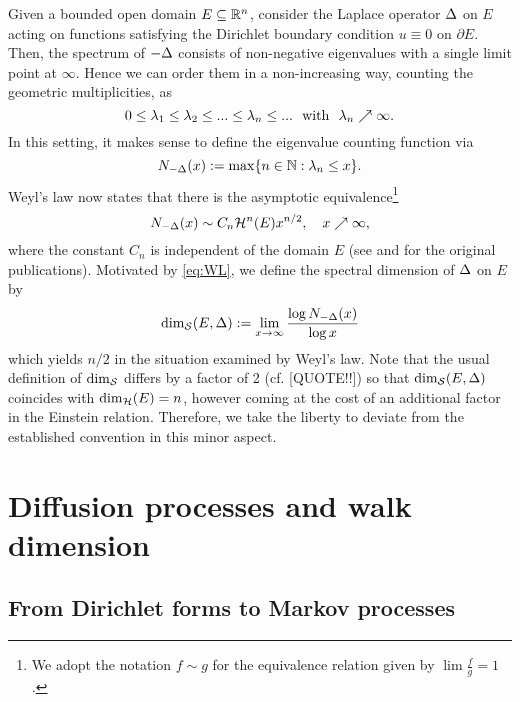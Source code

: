 Given a bounded open domain $E\subseteq\mathbb{R}^n$, consider the Laplace operator $\Delta$ on $E$ acting on functions satisfying the Dirichlet boundary condition $u\equiv0$ on $\partial E$. Then, the spectrum of $-\Delta$ consists of non-negative eigenvalues with a single limit point at $\infty$. Hence we can order them in a non-increasing way, counting the geometric multiplicities, as
\[
  0\leq\gl_1\leq\gl_2\leq...\leq\gl_n\leq...\ \text{ with }\ \gl_n\nearrow\infty. 
\]
In this setting, it makes sense to define the eigenvalue counting function via 
\begin{equation}\label{eq:DECF}
  N_{-\Delta}(x):=\max\{n\in\mathbb{N}:\lambda_n\leq x\}.
\end{equation}
Weyl's law now states that there is the asymptotic equivalence\footnote{We adopt the notation $f\sim g$ for the equivalence relation given by $\lim\frac{f}{g}=1$.}
\begin{equation}\label{eq:WL}
  N_{-\Delta}(x)\sim C_n\mathcal{H}^n(E)x^{n/2},\quad x\nearrow\infty,
\end{equation}
where the constant $C_n$ is independent of the domain $E$ (see \cite{Weyl1911} and \cite{Weyl1912} for the original publications). Motivated by \eqref{eq:WL}, we define the spectral dimension of $\Delta$ on $E$ by
\begin{equation}
  \dim_{\mathcal{S}}(E,\Delta):=\lim_{x\to\infty}\frac{\log N_{-\Delta}(x)}{\log x}
\end{equation}
which yields $n/2$ in the situation examined by Weyl's law. Note that the usual definition of $\dim_{\mathcal{S}}$ differs by a factor of 2 (cf. [QUOTE!!]) so that $\dim_{\mathcal{S}}(E,\Delta)$ coincides with $\dim_{\mathcal{H}}(E)=n$, however coming at the cost of an additional factor in the Einstein relation. Therefore, we take the liberty to deviate from the established convention in this minor aspect.




\newpage

\section{Diffusion processes and walk dimension}

\subsection{From Dirichlet forms to Markov processes}


